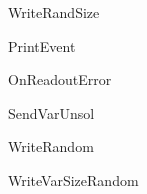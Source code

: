 \begin{procdesc}{WriteRandSize}{}
\end{procdesc}

\begin{procdesc}{PrintEvent}{}
\end{procdesc}

\begin{procdesc}{OnReadoutError}{}
\end{procdesc}

\begin{procdesc}{SendVarUnsol}{}
\end{procdesc}

\begin{procdesc}{WriteRandom}{}
\end{procdesc}

\begin{procdesc}{WriteVarSizeRandom}{}
\end{procdesc}
